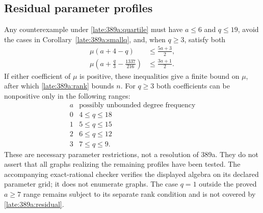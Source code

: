 \documentclass[11pt,a4paper]{article}
\theoremstyle{definition}\newtheorem{definition}[theorem]{Definition}
\theoremstyle{remark}\newtheorem{remark}[theorem]{Remark}
\begin{document}
\subsection{Residual parameter profiles}
Any counterexample under \eqref{late:389a:quartile} must have $a\le6$
and $q\le19$, avoid the cases in Corollary~\ref{late:389a:smallq}, and,
when $q\ge3$, satisfy both
\begin{equation}\label{late:389a:residual}
 \begin{split}
 \mu(a+4-q)&\le\frac{5a+3}{2},\\
 \mu\left(a+\frac q3-\frac{1337}{216}\right)&\le\frac{3a+1}{2}.
 \end{split}
\end{equation}
If either coefficient of $\mu$ is positive, these inequalities give a
finite bound on $\mu$, after which \eqref{late:389a:rank} bounds $n$.
For $q\ge3$ both coefficients can be nonpositive only in the following
ranges:
\[
\begin{array}{c|c}
a&\text{possibly unbounded degree frequency}\\\hline
0&4\le q\le18\\
1&5\le q\le15\\
2&6\le q\le12\\
3&7\le q\le9.
\end{array}
\]
These are necessary parameter restrictions, not a resolution of 389a.
They do not assert that all graphs realizing the remaining profiles
have been tested. The accompanying exact-rational checker verifies the
displayed algebra on its declared parameter grid; it does not enumerate
graphs. The case $q=1$ outside the proved $a\ge7$ range remains subject
to its separate rank condition and is not covered by
\eqref{late:389a:residual}.


\end{document}
